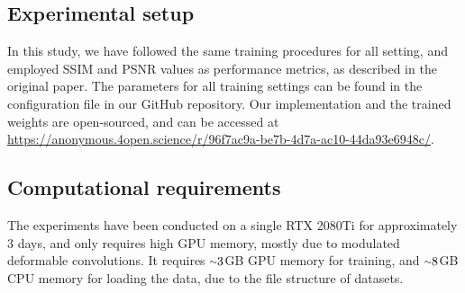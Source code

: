 \subsection{Experimental setup}

In this study, we have followed the same training procedures for all setting, and employed SSIM and PSNR values as performance metrics, as described in the original paper. The parameters for all training settings can be found in the configuration file in our GitHub repository. Our implementation and the trained weights are open-sourced, and can be accessed at \url{https://anonymous.4open.science/r/96f7ac9a-be7b-4d7a-ac10-44da93e6948c/}.


\subsection{Computational requirements}
The experiments have been conducted on a single RTX 2080Ti for approximately 3 days, and only requires high GPU memory, mostly due to modulated deformable convolutions. It requires ${\raise.17ex\hbox{$\scriptstyle\mathtt{\sim}$}}3$GB GPU memory for training, and ${\raise.17ex\hbox{$\scriptstyle\mathtt{\sim}$}}8$GB CPU memory for loading the data, due to the file structure of datasets. 



